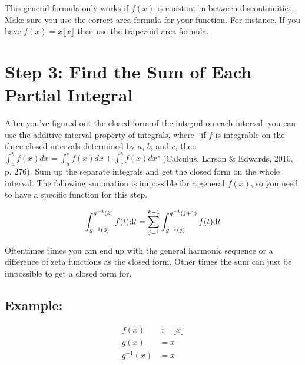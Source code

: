 \documentclass[12pt]{article}
\begin{document}
		This general formula only works if $f(x)$ is constant in between discontinuities. Make sure you
		use the correct area formula for your function. For instance, If you have $f(x)=x\lfloor x\rfloor$
		then use the trapezoid area formula.

\section*{Step 3: Find the Sum of Each Partial Integral}

	After you've figured out the closed form of the integral on each interval, you can use the
	additive interval property of integrals, where ``if $f$ is integrable on the three closed
	intervals determined by $a$, $b$, and $c$, then $\int_a^bf(x)dx=\int_a^cf(x)dx+\int_c^bf(x)dx$"
	(Calculus, Larson \& Edwards, 2010, p. 276). Sum up the separate integrals and get the closed
	form on the whole interval. The following summation is impossible for a general $f(x)$, so you
	need to have a specific function for this step.

	\begin{align*}
		\int_{g^{-1}(0)}^{g^{-1}(k)}f(t)\text dt=\sum_{j=1}^{k-1}\int_{g^{-1}(j)}^{g^{-1}(j+1)}f(t)\text dt
	\end{align*}

	Oftentimes times you can end up with the general harmonic sequence or a difference of zeta functions as
	the closed form. Other times the sum can just be impossible to get a closed form for.

	\subsection*{Example:}

		\begin{minipage}{0.5\textwidth}
			\begin{align*}
				f(x) & := \lfloor x\rfloor\\
				g(x) & = x\\
				g^{-1}(x) & = x
			\end{align*}
		\end{minipage}
		\hfill
		\begin{minipage}{0.5\textwidth}
		\end{minipage}
\end{document}
